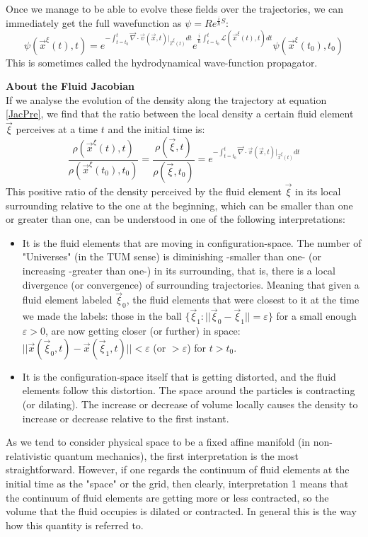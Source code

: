 \documentclass[11pt, a4paper]{article} %
\newcommand{\Lg}{\mathscr{L}}
\DeclareRobustCommand{\mybox}[2][gray!20]{%
\begin{tcolorbox}[   %
        left=1cm,
        right=1cm,
        top=0.5cm,
        bottom=0.5cm,
        colback=#1,
        colframe=#1,
        width=\dimexpr\textwidth\relax, 
        enlarge left by=0mm,
        boxsep=5pt,
        arc=0pt,outer arc=0pt,
        ]
        #2
\end{tcolorbox}
}
\begin{document}
Once we manage to be able to evolve these fields over the trajectories, we can immediately get the full wavefunction as $\psi=Re^{\frac{i}{\hbar}S}$:
\begin{equation}
\psi(\vec{x}^\xi(t),t)=e^{-\int_{t=t_0}^t \vec{\nabla}\cdot \vec{v}(\vec{x},t)\rvert_{\vec{x}^\xi(t)} dt}e^{\frac{i}{\hbar}\int_{t=t_0}^t \Lg(\vec{x}^\xi(t),t) dt}\psi(\vec{x}^\xi(t_0),t_0)
\end{equation}
This is sometimes called the hydrodynamical wave-function propagator.

\mybox{{\bf About the Fluid Jacobian\\ }
If we analyse the evolution of the density along the trajectory at equation \eqref{JacPre}, we find that the ratio between the local density a certain fluid element $\vec{\xi}$ perceives at a time $t$ and the initial time is:
\begin{equation}
\frac{\rho(\vec{x}^\xi(t),t)}{\rho(\vec{x}^\xi(t_0),t_0)}=\frac{\rho(\vec{\xi},t)}{\rho(\vec{\xi},t_0)}=e^{-\int_{t=t_0}^t \vec{\nabla}\cdot \vec{v}(\vec{x},t)\rvert_{\vec{x}^\xi(t)} dt}
\end{equation}
This positive ratio of the density perceived by the fluid element $\vec{\xi}$ in its local surrounding relative to the one at the beginning, which can be smaller than one or greater than one, can be understood in one of the following interpretations: 
\begin{itemize}
\item It is the fluid elements that are moving in configuration-space. The number of "Universes" (in the TUM sense) is diminishing -smaller than one- (or increasing -greater than one-) in its surrounding, that is, there is a local divergence (or convergence) of surrounding trajectories. Meaning that given a fluid element labeled $\vec{\xi}_0$, the fluid elements that were closest to it at the time we made the labels: those in the ball $\{\vec{\xi}_1:||\vec{\xi}_0-\vec{\xi}_1||=\varepsilon\}$  for a small enough $\varepsilon>0$, are now getting closer (or further) in space: $||\vec{x}(\vec{\xi}_0,t)-\vec{x}(\vec{\xi}_1,t)||<\varepsilon$ (or $>\varepsilon$) for $t>t_0$.
\item It is the configuration-space itself that is getting distorted, and the fluid elements follow this distortion. The space around the particles is contracting (or dilating). The increase or decrease of volume locally causes the density to increase or decrease relative to the first instant.
\end{itemize}
As we tend to consider physical space to be a fixed affine manifold (in non-relativistic quantum mechanics), the first interpretation is the most straightforward. However, if one regards the continuum of fluid elements at the initial time as the "space" or the grid, then clearly, interpretation 1 means that the continuum of fluid elements are getting more or less contracted, so the volume that the fluid occupies is dilated or contracted. In general this is the way how this quantity is referred to. \\

}
\end{document}
